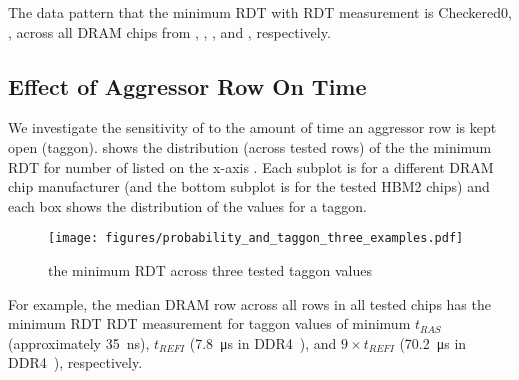 The data pattern that   the minimum RDT with  RDT measurement is
Checkered0, ,  
across all  DRAM chips from , , , and , respectively.



\subsection{Effect of Aggressor Row On Time}

We investigate the sensitivity of \phenomenon{} to the amount of time an
aggressor row is kept open (\gls{taggon}).  shows the
distribution (across tested rows) of the 
the minimum RDT for  number of 
 listed on the x-axis . Each subplot is for a different DRAM chip
manufacturer (and the bottom subplot is for the tested HBM2 chips)\nb{,} and
each box shows the distribution of the  values for a
\gls{taggon}.

\begin{figure}[!ht]
    \centering
    \texttt{[image: figures/probability\_and\_taggon\_three\_examples.pdf]}
    \caption{ the minimum RDT
     across three tested \gls{taggon} values}
    \label{fig:rdt_taggon}
\end{figure}



For example, the median DRAM row  across all rows in all tested  chips has
  the minimum RDT  RDT measurement for
 \gls{taggon} values of minimum $t_{RAS}$ (approximately \SI{35}{\nano\second}),
 $t_{REFI}$ (\SI{7.8}{\micro\second} in DDR4~\cite{jedec2020ddr4}), and
 $9\times{}t_{REFI}$ (\SI{70.2}{\micro\second} in DDR4~\cite{jedec2020ddr4}),
 respectively.

